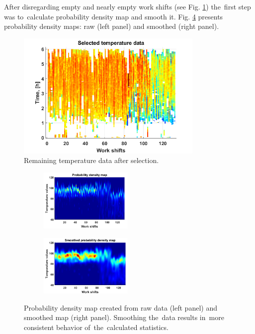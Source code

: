 After disregarding empty and nearly empty work shifts (see Fig. \ref{fig: lhd_temp_map2}) the~first step was to~calculate probability density map and smooth it. Fig. \ref{fig:ks_maps} presents probability density maps: raw (left panel) and smoothed (right panel).

\begin{figure}[ht!]
\centering
\includegraphics[width = 0.8\textwidth]{wykresy/lhd_temp_map2.png}
\caption{Remaining temperature data after selection.}
\label{fig: lhd_temp_map2}
\end{figure}

\begin{figure}[!ht]
 \centering
 \begin{subfigure}
   \centering
   \includegraphics[width=0.49\textwidth]{wykresy/ks_map.png}
   \label{fig:ks_map}
 \end{subfigure}
 \begin{subfigure}
   \centering
		\includegraphics[width=0.49\textwidth]{wykresy/ks_map2.png}
  \label{fig:ks_map2}
 \end{subfigure}
 \caption{Probability density map created from raw data (left panel) and smoothed map (right panel). Smoothing the~data results in~more consistent behavior of~the~calculated statistics.}
 \label{fig:ks_maps}
\end{figure}

